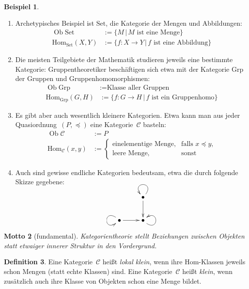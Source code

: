 \documentclass[a4paper,ngerman]{scrartcl}
\theoremstyle{definition}
\newtheorem{defn}{Definition}[section]
\newtheorem{bsp}[defn]{Beispiel}
\theoremstyle{plain}
\newtheorem{motto}[defn]{Motto}
\theoremstyle{remark}
\newcommand{\C}{\mathcal{C}}
\newcommand{\Hom}{\mathrm{Hom}}
\DeclareMathOperator{\Ob}{Ob}
\newcommand{\Set}{\mathrm{Set}}
\newcommand{\Grp}{\mathrm{Grp}}
\begin{document}
\begin{bsp}\begin{enumerate}
  \item Archetypisches Beispiel ist $\Set$, die Kategorie der Mengen und Abbildungen:
  \begin{align*}
    \Ob \Set &:= \{ M \,|\, \text{$M$ ist eine Menge} \} \\
    \Hom_\Set(X,Y) &:= \{ f:X \to Y \,|\, \text{$f$ ist eine Abbildung} \}
  \end{align*}
  \item Die meisten Teilgebiete der Mathematik studieren jeweils eine bestimmte
  Kategorie: Gruppentheoretiker beschäftigen sich etwa mit der Kategorie
  $\Grp$ der Gruppen und Gruppenhomomorphismen:
  \begin{align*}
    \Ob \Grp &:= \text{Klasse aller Gruppen} \\
    \Hom_\Grp(G,H) &:= \{ f:G \to H \,|\, \text{$f$ ist ein Gruppenhomo} \}
  \end{align*}
  \item Es gibt aber auch wesentlich kleinere Kategorien. Etwa kann man aus
  jeder Quasiordnung~$(P,\preceq)$ eine Kategorie~$\C$ basteln:
  \begin{align*}
    \Ob \C &:= P \\
    \Hom_\C(x,y) &:= \begin{cases}
      \text{einelementige Menge}, & \text{falls $x \preceq y$,} \\
      \text{leere Menge}, & \text{sonst}
    \end{cases}
  \end{align*}
  \item Auch sind gewisse endliche Kategorien bedeutsam, etwa die durch
  folgende Skizze gegebene:

  \[ \xymatrix{
    & \bullet \ar[d] \ar@(ur,ul) \\
    \bullet \ar[r] \ar@(ul,dl) & \bullet \ar@(dr,ur)
  } \]
\end{enumerate}\end{bsp}

\begin{motto}[fundamental]Kategorientheorie stellt \emph{Beziehungen zwischen
Objekten} statt etwaiger innerer Struktur in den Vordergrund.\end{motto}

\begin{defn}Eine Kategorie~$\C$ heißt \emph{lokal klein}, wenn ihre Hom-Klassen
jeweils schon Mengen (statt echte Klassen) sind. Eine Kategorie~$\C$ heißt
\emph{klein}, wenn zusätzlich auch ihre Klasse von Objekten schon eine Menge
bildet.\end{defn}
\end{document}
